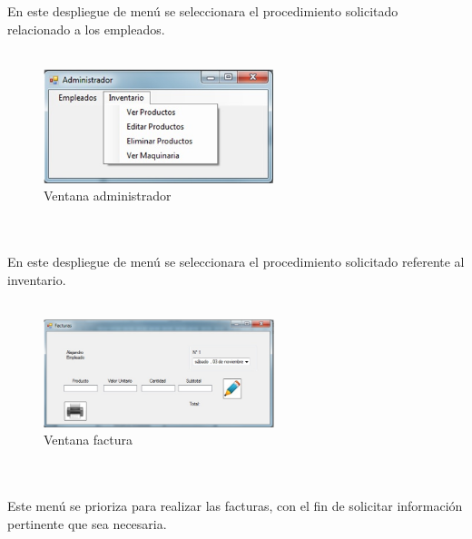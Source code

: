 \\%
\\%
En este despliegue de men\'u se seleccionara el procedimiento solicitado relacionado a los empleados.
\\%
\\%
\begin{figure}[htbp]
	\centering
		\includegraphics[width=0.60\textwidth]{images/Segundoadministrador.jpg}
	\caption{Ventana administrador}
	\label{fig:Ventana administrador}
\end{figure}%
\\%
\\%
En este despliegue de men\'u se seleccionara el procedimiento solicitado referente al inventario.
\\%
\\%
\begin{figure}[htbp]
	\centering
		\includegraphics[width=0.60\textwidth]{images/Facturas.jpg}
	\caption{Ventana factura}
	\label{fig:Ventana factura}
\end{figure}%
\\%
\\%
Este men\'u se prioriza para realizar las facturas, con el fin de solicitar informaci\'on pertinente que sea necesaria.
\\%
\\%
\mbox{}
\newpage%
%
\mbox{}
\newpage%
%
